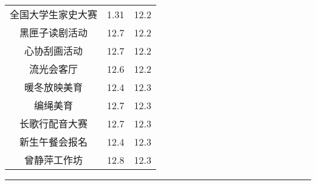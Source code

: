 \documentclass[letterpaper, 12pt]{article}
\begin{document}
\begin{multicols}{2}
{\begin{longtable}{|c|c|c|}
    全国大学生家史大赛 & 1.31 & 12.2\\
    黑匣子读剧活动 & 12.7 & 12.2\\
    心协刮画活动 & 12.7 & 12.2\\
    流光会客厅 & 12.6 & 12.2\\
    暖冬放映美育 & 12.4 & 12.3\\
    编绳美育 & 12.7 & 12.3\\
    长歌行配音大赛 & 12.7 & 12.3\\
    新生午餐会报名 & 12.4 & 12.3\\
    曾静萍工作坊 & 12.8 & 12.3\\
    
    \hline
\end{longtable}
\unskip
\unpenalty
\unpenalty}\unvbox\colbbox
\end{multicols}
\hrule
\pagebreak
\end{document}

